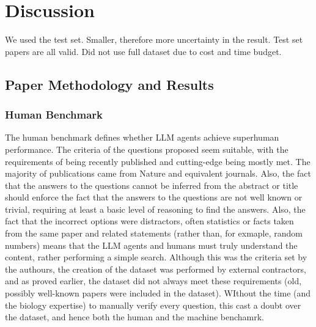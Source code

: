 \section{Discussion}
\label{sec:discussion}

We used the test set. Smaller, therefore more uncertainty in the result. Test set papers are all valid. Did not use full dataset due to cost and time budget. 

\subsection{Paper Methodology and Results}

\subsubsection{Human Benchmark}
The human benchmark defines whether LLM agents achieve superhuman performance. The criteria of the questions proposed seem suitable, with the requirements of being recently published and cutting-edge being mostly met. The majority of publications came from Nature and equivalent journals. Also, the fact that the answers to the questions cannot be inferred from the abstract or title should enforce the fact that the answers to the questions are not well known or trivial, requiring at least a basic level of reasoning to find the answers. Also, the fact that the incorrect options were distractors, often statistics or facts taken from the same paper and related statements (rather than, for exmaple, random numbers) means that the LLM agents and humans must truly understand the content, rather performing a simple search. Although this was the criteria set by the authours, the creation of the dataset was performed by external contractors, and as proved earlier, the dataset did not always meet these requirements (old, possibly well-known papers were included in the dataset). WIthout the time (and the biology expertise) to manually verify every question, this cast a doubt over the dataset, and hence both the human and the machine benchamrk. \\

